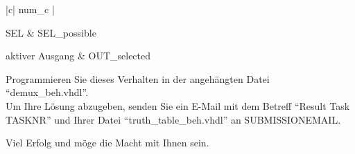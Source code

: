\documentclass[a4paper,12pt]{article}
\newcommand\Tstrut{\rule{0pt}{2.6ex}}       %
\begin{document}
\begin{table}[h!]
\centering
    \begin{tabular}{|c| {{num_c}} |} \hline \Tstrut
		SEL & {{SEL_possible}}  \\ \hline \Tstrut
		aktiver Ausgang & {{OUT_selected}} \\
		\hline
    \end{tabular}
    \caption{aktiver Ausgang in Abh\"angigkeit von SEL}
    \label{tab:SELoutput}
\end{table}

Programmieren Sie dieses Verhalten in der angeh\"angten Datei "`demux\_beh.vhdl"'.\\

Um Ihre L\"osung abzugeben, senden Sie ein E-Mail mit dem Betreff "`Result Task {{TASKNR}}"' und Ihrer Datei "`truth\_table\_beh.vhdl"'  an {{SUBMISSIONEMAIL}}. 

\vspace{0.7cm}
Viel Erfolg und m\"oge die Macht mit Ihnen sein.
\end{document}
